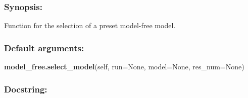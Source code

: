 \subsubsection{Synopsis:}

Function for the selection of a preset model-free model.

\subsubsection{Default arguments:}

\textsf{\textbf{model\_free.select\_model}(self, run=None, model=None, res\_num=None)
}


\subsubsection{Docstring:}

